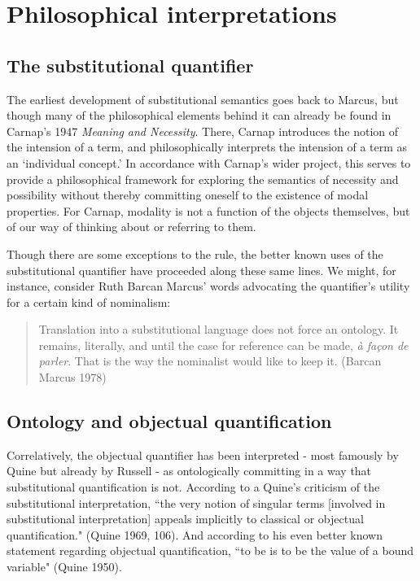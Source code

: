 \documentclass[]{article}
\begin{document}
\section{Philosophical interpretations}
\subsection{The substitutional quantifier}
The earliest development of substitutional semantics goes back to Marcus, but though many of the philosophical elements behind it can already be found in Carnap's 1947 \textit{Meaning and Necessity}. There, Carnap introduces the notion of the intension of a term, and philosophically interprets the intension of a term as an `individual concept.' In accordance with Carnap's wider project, this serves to provide a philosophical framework for exploring the semantics of necessity and possibility without thereby committing oneself to the existence of modal properties. For Carnap, modality is not a function of the objects themselves, but of our way of thinking about or referring to them.

Though there are some exceptions to the rule, the better known uses of the substitutional quantifier have proceeded along these same lines. We might, for instance, consider Ruth Barcan Marcus' words advocating the quantifier's utility for a certain kind of nominalism: 
\begin{quote}
Translation into a substitutional language does not force an ontology. It remains, literally, and until the case for reference can be made, \textit{\`{a} fa\c{c}on de parler}. That is the way the nominalist would like to keep it. (Barcan Marcus 1978)
\end{quote}

\subsection{Ontology and objectual quantification}
Correlatively, the objectual quantifier has been interpreted - most famously by Quine but already by Russell - as ontologically committing in a way that substitutional quantification is not. According to a Quine's criticism of the substitutional interpretation, ``the very notion of singular terms [involved in substitutional interpretation] appeals implicitly to classical or objectual quantification." (Quine 1969, 106). And according to his even better known statement regarding objectual quantification, ``to be is to be the value of a bound variable" (Quine 1950).
\end{document}
